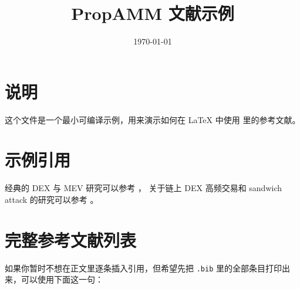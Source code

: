 \documentclass[12pt]{ctexart}
\title{PropAMM 文献示例}
\author{}
\date{\today}
\begin{document}
\maketitle

\section{说明}

这个文件是一个最小可编译示例，用来演示如何在 \LaTeX{} 中使用
 里的参考文献。

\section{示例引用}

经典的 DEX 与 MEV 研究可以参考 \cite{daian2020flashboys}，
关于链上 DEX 高频交易和 sandwich attack 的研究可以参考 \cite{zhou2021highfrequency}。

\section{完整参考文献列表}

如果你暂时不想在正文里逐条插入引用，但希望先把 \texttt{.bib} 里的全部条目打印出来，可以使用下面这一句：

\nocite{*}



\end{document}
